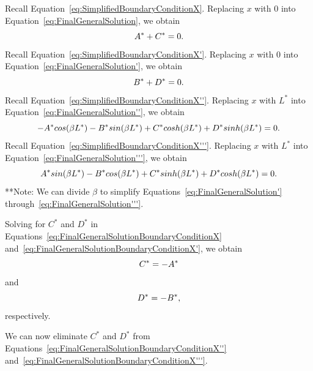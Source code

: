 \documentclass[12pt]{article}
\begin{document}
Recall Equation~\eqref{eq:SimplifiedBoundaryConditionX}. Replacing $x$ with $0$ into Equation~\eqref{eq:FinalGeneralSolution}, we obtain
\begin{equation}\label{eq:FinalGeneralSolutionBoundaryConditionX}
    \centering
    A^*+C^*=0.
\end{equation}
Recall Equation~\eqref{eq:SimplifiedBoundaryConditionX'}. Replacing $x$ with $0$ into Equation~\eqref{eq:FinalGeneralSolution'}, we obtain
\begin{equation}\label{eq:FinalGeneralSolutionBoundaryConditionX'}
    \centering
    B^*+D^*=0.
\end{equation}
Recall Equation~\eqref{eq:SimplifiedBoundaryConditionX''}. Replacing $x$ with $L^*$ into Equation~\eqref{eq:FinalGeneralSolution''}, we obtain
\begin{equation}\label{eq:FinalGeneralSolutionBoundaryConditionX''}
    \centering
    -A^*cos(\beta L^*)-B^*sin(\beta L^*)+C^*cosh(\beta L^*)+D^*sinh(\beta L^*)=0.
\end{equation}
Recall Equation~\eqref{eq:SimplifiedBoundaryConditionX'''}. Replacing $x$ with $L^*$ into Equation~\eqref{eq:FinalGeneralSolution'''}, we obtain
\begin{equation}\label{eq:FinalGeneralSolutionBoundaryConditionX'''}
    \centering
    A^*sin(\beta L^*)-B^*cos(\beta L^*)+C^*sinh(\beta L^*)+D^*cosh(\beta L^*)=0.
\end{equation}
**Note: We can divide $\beta$ to simplify Equations~\eqref{eq:FinalGeneralSolution'} through~\eqref{eq:FinalGeneralSolution'''}.

Solving for $C^*$ and $D^*$ in Equations~\eqref{eq:FinalGeneralSolutionBoundaryConditionX} and~\eqref{eq:FinalGeneralSolutionBoundaryConditionX'}, we obtain
\begin{equation}\label{eq:IsolateFinalGeneralSolutionBoundaryConditionX}
    \centering
    C^*=-A^*
\end{equation}
and
\begin{equation}\label{eq:IsolateFinalGeneralSolutionBoundaryConditionX'}
    \centering
    D^*=-B^*,
\end{equation}
respectively.

We can now eliminate $C^*$ and $D^*$ from Equations~\eqref{eq:FinalGeneralSolutionBoundaryConditionX''} and~\eqref{eq:FinalGeneralSolutionBoundaryConditionX'''}.
\end{document}
